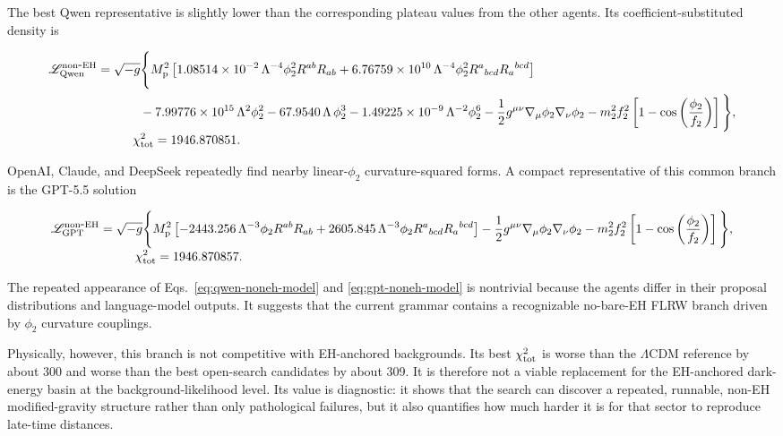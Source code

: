 \documentclass[aps,prd,twocolumn,superscriptaddress,nofootinbib,longbibliography]{revtex4-2}
\newcommand{\Mp}{M_{\rm p}}
\newcommand{\Lam}{\Lambda}
\newcommand{\chiT}{\chi^2_{\rm tot}}
\begin{document}
The best Qwen representative is slightly lower than the corresponding plateau values from the other agents.  Its coefficient-substituted density is
\begin{widetext}
\begingroup\small
\begin{align}
\mathscr{L}^{\rm non\mbox{-}EH}_{\rm Qwen}
&=\sqrt{-g}\Bigg\{
\Mp^2\left[
1.08514\times10^{-2}\,\Lam^{-4}\phi_2^2 R^{ab}R_{ab}
+6.76759\times10^{10}\,\Lam^{-4}\phi_2^2 R^a{}_{bcd}R_a{}^{bcd}
\right]\nonumber\\
&\hspace{1.2cm}
-7.99776\times10^{15}\,\Lam^{2}\phi_2^2
-67.9540\,\Lam\,\phi_2^3
-1.49225\times10^{-9}\,\Lam^{-2}\phi_2^6
-\frac12 g^{\mu\nu}\nabla_\mu\phi_2\nabla_\nu\phi_2
-m_2^2f_2^2\left[1-\cos\left(\frac{\phi_2}{f_2}\right)\right]
\Bigg\},
\nonumber\\[-1mm]
&\hspace{1cm}
\chiT=1946.870851 .
\label{eq:qwen-noneh-model}
\end{align}
\endgroup
\end{widetext}
OpenAI, Claude, and DeepSeek repeatedly find nearby linear-$\phi_2$ curvature-squared forms.  A compact representative of this common branch is the GPT-5.5 solution
\begin{widetext}
\begingroup\small
\begin{align}
\mathscr{L}^{\rm non\mbox{-}EH}_{\rm GPT}
&=\sqrt{-g}\Bigg\{
\Mp^2\left[
-2443.256\,\Lam^{-3}\phi_2R^{ab}R_{ab}
+2605.845\,\Lam^{-3}\phi_2R^a{}_{bcd}R_a{}^{bcd}
\right]
-\frac12 g^{\mu\nu}\nabla_\mu\phi_2\nabla_\nu\phi_2
-m_2^2f_2^2\left[1-\cos\left(\frac{\phi_2}{f_2}\right)\right]
\Bigg\},
\nonumber\\[-1mm]
&\hspace{1cm}
\chiT=1946.870857 .
\label{eq:gpt-noneh-model}
\end{align}
\endgroup
\end{widetext}
The repeated appearance of Eqs.~\eqref{eq:qwen-noneh-model} and \eqref{eq:gpt-noneh-model} is nontrivial because the agents differ in their proposal distributions and language-model outputs.  It suggests that the current grammar contains a recognizable no-bare-EH FLRW branch driven by $\phi_2$ curvature couplings.

Physically, however, this branch is not competitive with EH-anchored backgrounds.  Its best $\chi^2_{\rm tot}$ is worse than the $\Lambda$CDM reference by about 300 and worse than the best open-search candidates by about 309.  It is therefore not a viable replacement for the EH-anchored dark-energy basin at the background-likelihood level.  Its value is diagnostic: it shows that the search can discover a repeated, runnable, non-EH modified-gravity structure rather than only pathological failures, but it also quantifies how much harder it is for that sector to reproduce late-time distances.
\end{document}
